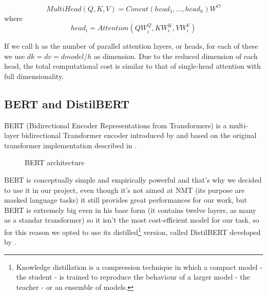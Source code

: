 $$MultiHead(Q, K, V ) = Concat(head_{1}, ..., head_{h})W^O$$
where
$$head_{i} = Attention(QW^Q_{i}, KW^K_{i}, VW^V_{i})$$

If we call h as the number of parallel attention layers, or heads, for each of these we use $dk=dv=dmodel/h$ as dimension. Due to the reduced dimension of each head, the total computational cost is similar to that of single-head attention with full dimensionality.
\subsection{BERT and DistilBERT}\label{subsec:bert}
BERT (Bidirectional Encoder Representations from Transformers) is a multi-layer bidirectional Transformer encoder introduced by \cite{devlin2018bert} and  based on the original transformer implementation described in \cite{vaswani2017attention}.
\begin{figure}[H]%
    \centering
    \caption{BERT architecture}
    \label{fig:bert}%
\end{figure}
BERT is conceptually simple and empirically powerful and that's why we decided to use it in our project, even though it's not aimed at NMT (its purpose are masked language tasks) it still provides great performances for our work, but BERT is extremely big even in his base form (it contains twelve layers, as many as a standar transformer) so it isn't the most cost-efficient model for our task, so for this reason we opted to use its distilled\footnote{Knowledge distillation is a compression technique in which a compact model - the student - is trained to reproduce the behaviour of a larger model - the teacher - or an ensemble of models.} version, called DistilBERT developed by \cite{sanh2019distilbert}.
\vspace{3mm}

